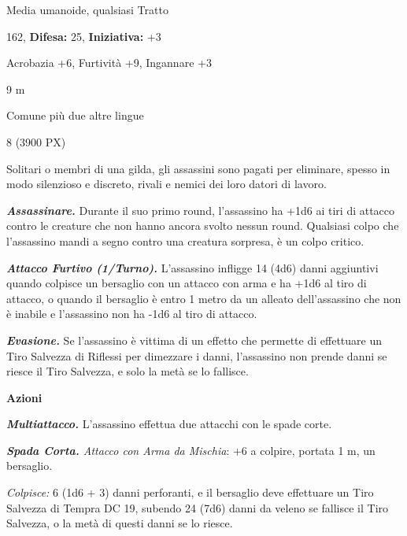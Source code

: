 \begin{multicols}{2}
{
\begin{description}[noitemsep, topsep=0pt, parsep=0pt, partopsep=0pt, leftmargin=0cm, labelwidth=2.2cm]
    \item[\textbf{Taglia/Tipo:}] Media umanoide, qualsiasi Tratto
    \item[\textbf{Caratt.:}] 
    \item[\textbf{Punti Ferita:}] 162,  \textbf{Difesa:} 25,  \textbf{Iniziativa:} +3
    \item[\textbf{Comp.:}] Acrobazia +6, Furtività +9, Ingannare +3
    \item[\textbf{Tiri Salvez.:}] 
    \item[\textbf{Movimento:}] 9 m
    \item[\textbf{Linguaggi:}] Comune più due altre lingue
    \item[\textbf{Sfida:}] 8 (3900 PX)\smallskip
\end{description}

Solitari o membri di una gilda, gli assassini sono pagati per eliminare, spesso in modo silenzioso e discreto, rivali e nemici dei loro datori di lavoro.

\emph{\textbf{Assassinare.}} Durante il suo primo round, l'assassino ha +1d6 ai tiri di attacco contro le creature che non hanno ancora svolto nessun round. Qualsiasi colpo che l'assassino mandi a segno contro una creatura sorpresa, è un colpo critico.

\emph{\textbf{Attacco Furtivo (1/Turno).}} L'assassino infligge 14 (4d6) danni aggiuntivi quando colpisce un bersaglio con un attacco con arma e ha +1d6 al tiro di attacco, o quando il bersaglio è entro 1 metro da un alleato dell'assassino che non è inabile e l'assassino non ha -1d6 al tiro di attacco.

\emph{\textbf{Evasione.}} Se l'assassino è vittima di un effetto che permette di effettuare un Tiro Salvezza di Riflessi per dimezzare i danni, l'assassino non prende danni se riesce il Tiro Salvezza, e solo la metà se lo fallisce.

\textbf{Azioni}

\emph{\textbf{Multiattacco.}} L'assassino effettua due attacchi con le spade corte.

\emph{\textbf{Spada Corta.} Attacco con Arma da Mischia}: +6 a colpire, portata 1 m, un bersaglio.

\emph{Colpisce:} 6 (1d6 + 3) danni perforanti, e il bersaglio deve effettuare un Tiro Salvezza di Tempra DC 19, subendo 24 (7d6) danni da veleno se fallisce il Tiro Salvezza, o la metà di questi danni se lo riesce.

}
\end{multicols}
